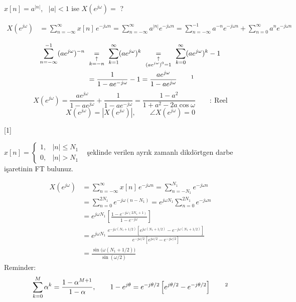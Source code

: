 \documentclass[11pt,a4paper]{article}
\begin{document}
\noindent\begin{minipage}{\linewidth}
\begin{ornek}
  $x[n]=a^{|n|}$, \ $|a|<1$ ise $X(e^{j\omega})=$ ?
\end{ornek}\nopagebreak
\begin{align*}
  X(e^{j\omega}) &=\sum_{n=-\infty}^{\infty}x[n]\,e^{-j\omega n}=\sum_{n=-\infty}^{\infty}a^{|n|}e^{-j\omega n}
    =\sum_{n=-\infty}^{-1}a^{-n}e^{-j\omega n}+\sum_{n=0}^{\infty}a^{n}e^{-j\omega n}
\end{align*}
\end{minipage}
\begin{align*}
  \sum_{n=-\infty}^{-1}(ae^{j\omega})^{-n}\ &\underset{\substack{\uparrow\\ k=-n}}{=}\ \sum_{k=1}^{\infty}(ae^{j\omega})^{k}\ \underset{\substack{\uparrow\\ (ae^{j\omega})^0=1}}{=}\ \sum_{k=0}^{\infty}(ae^{j\omega})^{k}-1\\
  &=\frac{1}{1-ae^{-j\omega}}-1=\frac{ae^{j\omega}}{1-ae^{j\omega}}\qquad\text{\footnotemark}
\end{align*}
\[ X(e^{j\omega})=\frac{ae^{j\omega}}{1-ae^{j\omega}}+\frac{1}{1-ae^{-j\omega}}=\frac{1-a^2}{1+a^2-2a\cos\omega}\qquad :\ \text{Reel} \]
\[ X(e^{j\omega})=|X(e^{j\omega})|,\qquad \angle X(e^{j\omega})=0 \]

[1]

\nopagebreak
\begin{ornek}
  $x[n]=\begin{cases}1, & |n|\le N_1\\ 0, & |n|>N_1\end{cases}$ \ şeklinde verilen ayrık zamanlı dikdörtgen darbe işaretinin FT bulunuz.
\end{ornek}\nopagebreak
\begin{align*}
  X(e^{j\omega}) &=\sum_{n=-\infty}^{\infty}x[n]\,e^{-j\omega n}=\sum_{n=-N_1}^{N_1}e^{-j\omega n}\\
  &=\sum_{n=0}^{2N_1}e^{-j\omega(n-N_1)}=e^{j\omega N_1}\sum_{n=0}^{2N_1}e^{-j\omega n}\\
  &=e^{j\omega N_1}\left[\frac{1-e^{-j\omega(2N_1+1)}}{1-e^{-j\omega}}\right]\\
  &=e^{j\omega N_1}\,\frac{e^{-j\omega(N_1+1/2)}\left[e^{j\omega(N_1+1/2)}-e^{-j\omega(N_1+1/2)}\right]}{e^{-j\omega/2}\left[e^{j\omega/2}-e^{-j\omega/2}\right]}\\
  &=\frac{\sin\big(\omega(N_1+1/2)\big)}{\sin(\omega/2)}
\end{align*}
Reminder:
\[ \sum_{k=0}^{M}\alpha^k=\frac{1-\alpha^{M+1}}{1-\alpha},\qquad 1-e^{j\theta}=e^{-j\theta/2}\left[e^{j\theta/2}-e^{-j\theta/2}\right]\qquad\text{\footnotemark} \]
\end{document}
